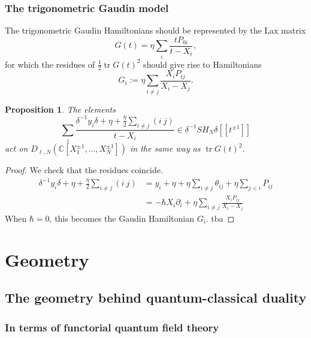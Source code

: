\documentclass[11pt]{report}
\newtheorem{prop}[theorem]{Proposition}
\theoremstyle{definition}
\theoremstyle{remark}
\theoremstyle{remark}
\newcommand{\C}{\mathbb{C}}
\begin{document}
\subsection{The trigonometric Gaudin model}

The trigonometric Gaudin Hamiltonians should be represented by the Lax matrix
\begin{equation*}
G(t) = \eta \sum_i \frac{tP_{0i}}{t-X_i},
\end{equation*}
for which the residues of $\frac{1}{2} \operatorname{tr} G(t)^2$ should give rise to Hamiltonians
\begin{equation*}
G_i := \eta \sum_{i \neq j} \frac{X_i P_{ij}}{X_i-X_j}.
\end{equation*}

\begin{prop}
The elements
\begin{equation*}
\sum_i \frac{\delta^{-1} y_i \delta + \eta + \frac{\eta}{2} \sum_{i \neq j} (i \ j)}{t-X_i} \in \delta^{-1} S\ddot H_N \delta[[t^{\pm 1}]]
\end{equation*}
act on $D_{\ell,N}(\C[X_1^{\pm 1},...,X_N^{\pm 1}])$ in the same way as $\operatorname{tr} G(t)^2$.
\end{prop}

\begin{proof}
We check that the residues coincide.
\begin{align*}
\delta^{-1} y_i \delta + \eta + \frac{\eta}{2} \sum_{i \neq j} (i \ j)
&= y_i + \eta + \eta \sum_{i \neq j} \theta_{ij} + \eta \sum_{j<i} P_{ij} \\
&= -\hbar X_i \partial_i + \eta \sum_{i \neq j} \frac{X_i P_{ij}}{X_i-X_j}
\end{align*}
When $\hbar = 0$, this becomes the Gaudin Hamiltonian $G_i$. tba
\end{proof}

\chapter{Geometry}\label{chapter:geometry}

\section{The geometry behind quantum-classical duality}

\subsection{In terms of functorial quantum field theory}
\end{document}
